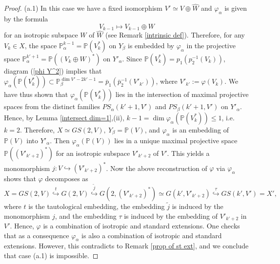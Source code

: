 \documentclass[12pt]{amsart}
\renewcommand{\phi}{\varphi}
\theoremstyle{definition}
\begin{document}
\begin{proof}
(a.1) In this case we have a fixed isomorphism $V'\simeq V\oplus \hat{W}$ and $\phi_{\alpha}$ is given by the formula
\begin{equation}\label{st eq 2}
V_{k-1}\mapsto V_{k-1}\oplus W
\end{equation}
for an isotropic subspace $W$ of $\hat{W}$ (see Remark \ref{intrinsic def}). Therefore, for any $V_k\in X$, the
space $\mathbb{P}^{k-1}_{\alpha}=\mathbb{P}(V_k^*)$ on $Y_{\beta}$ is embedded by $\phi_{\alpha}$ in the projective
space $\mathbb{P}^{k'+1}_{\alpha}=\mathbb{P}((V_k\oplus W)^*)$ on $Y'_{\alpha}$.
Since $\mathbb{P}(V_k^*)=p_1(p_2^{-1}(V_k))$, diagram (\ref{phi Y^2}) implies that
$\phi_{\alpha}(\mathbb{P}(V_k^*))\subset\mathbb{P}^{\dim V'-2k'-1}_{\beta}=\bar{p}_1(\bar{p}_2^{-1}(V'_{k'}))$, where
$V'_{k'}:=\phi(V_k)$. We have thus shown that $\phi_{\alpha}(\mathbb{P}(V_k^*))$ lies in the intersection of maximal
projective spaces from the distinct families $PS_{\alpha}(k'+1,V')$ and $PS_{\beta}(k'+1,V')$ on $Y'_{\alpha}$. Hence,
by Lemma \ref{intersect dim=1},(ii), $k-1=\dim\phi_{\alpha}(\mathbb{P}(V_k^*))\le1$, i.e. $k=2$. Therefore,
$X\simeq GS(2,V),\ Y_{\beta}=\mathbb{P}(V)$, and $\phi_{\alpha}$ is an embedding of $\mathbb{P}(V)$ into
$Y'_{\alpha}$. Then $\phi_{\alpha}(\mathbb{P}(V))$ lies in a unique maximal projective space
$\mathbb{P}((V'_{k'+2})^*)$ for an isotropic subspace $V'_{k'+2}$ of $V'$.
This yields a monomorphism $j:V\hookrightarrow(V'_{k'+2})^*$.
Now the above reconstruction of $\phi$ via $\phi_{\alpha}$ shows that $\phi$ decomposes as
\begin{equation}\label{decomp1}
X=GS(2,V)\overset{t}\hookrightarrow G(2,V)\overset{\tilde{j}}\hookrightarrow
G(2,(V'_{k'+2})^*)\simeq G(k',V'_{k'+2})\overset{\tau}\hookrightarrow GS(k',V')=X',
\end{equation}
where $t$ is the tautological
embedding, the embedding $\tilde{j}$ is induced by the monomorphism $j$, and the embedding $\tau$ is induced by the
embedding of $V'_{k'+2}$ in $V'$.
Hence, $\phi$ is a combination of isotropic and standard extensions. One checks that as a consequence $\phi_{\alpha}$
is also a combination of isotropic and standard extensions. However, this contradicts to Remark \ref{prop of st ext},
and we conclude that case (a.1) is impossible.


\end{proof}
\end{document}

